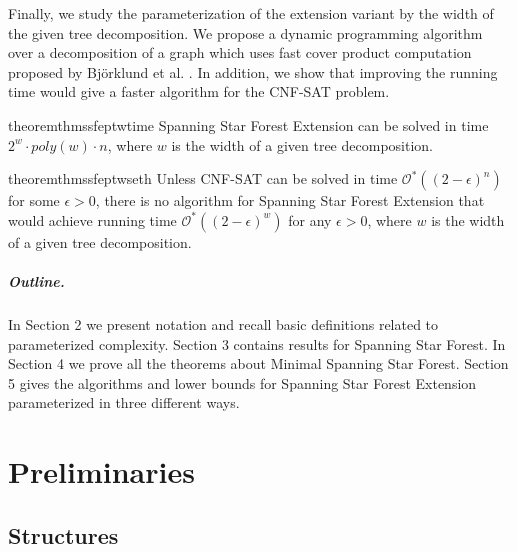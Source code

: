 \documentclass[en]{pracamgr}
\theoremstyle{definition}
\newcommand{\ssfp}{{\sc Spanning Star Forest}}
\newcommand{\mssfp}{{\sc Minimal Spanning Star Forest}}
\newcommand{\ssfep}{{\sc Spanning Star Forest Extension}}
\newcommand{\cnfsat}{{\sc CNF-SAT}}
\begin{document}
Finally, we study the parameterization of the extension variant by the width of the given tree decomposition. We propose a dynamic programming algorithm over a decomposition of a graph which uses fast cover product computation proposed by Björklund et al. \cite{CoverProduct}. In addition, we show that improving the running time would give a faster algorithm for the \cnfsat{} problem.

\begin{restatable}{theorem}{thmssfeptwtime}\label{thm-ssfep-tw-time}
	\ssfep{} can be solved in time $2^w\cdot poly(w)\cdot n$, where $w$ is the width of a given tree decomposition.
\end{restatable}

\begin{restatable}{theorem}{thmssfeptwseth}\label{thm-ssfep-tw-seth}
	Unless \cnfsat{} can be solved in time $\mathcal{O}^*((2-\epsilon)^n)$ for some $\epsilon > 0$, there is no algorithm for \ssfep{} that would achieve running time $\mathcal{O}^*((2-\epsilon)^{w})$ for any $\epsilon > 0$, where $w$ is the width of a given tree decomposition.
\end{restatable}

\paragraph{Outline.} In Section 2 we present notation and recall basic definitions related to parameterized complexity. Section 3 contains results for \ssfp{}. In Section 4 we prove all the theorems about \mssfp{}. Section 5 gives the algorithms and lower bounds for \ssfep{} parameterized in three different ways.

\chapter{Preliminaries}\label{sec2}

\section{Structures}
\end{document}
